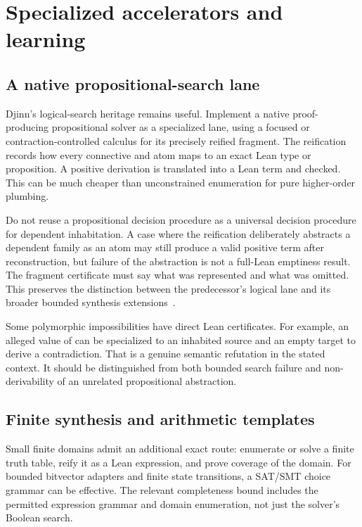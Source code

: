 \section{Specialized accelerators and learning}\label{sec:accelerators}

\subsection{A native propositional-search lane}

Djinn's logical-search heritage remains useful. Implement a native
proof-producing propositional solver as a specialized lane, using a focused or
contraction-controlled calculus for its precisely reified fragment. The
reification records how every connective and atom maps to an exact Lean type
or proposition. A positive derivation is translated into a Lean term and
checked. This can be much cheaper than unconstrained enumeration for pure
higher-order plumbing.

Do not reuse a propositional decision procedure as a universal decision
procedure for dependent inhabitation. A case where the reification deliberately
abstracts a dependent family as an atom may still produce a valid positive
term after reconstruction, but failure of the abstraction is not a full-Lean
emptiness result. The fragment certificate must say what was represented and
what was omitted. This preserves the distinction between the predecessor's
logical lane and its broader bounded synthesis extensions~\cite{djex-readme}.

Some polymorphic impossibilities have direct Lean certificates. For example,
an alleged value of
 can be specialized to an inhabited source and
an empty target to derive a contradiction. That is a genuine semantic
refutation in the stated context. It should be distinguished from both bounded
search failure and non-derivability of an unrelated propositional abstraction.

\subsection{Finite synthesis and arithmetic templates}

Small finite domains admit an additional exact route: enumerate or solve a
finite truth table, reify it as a Lean expression, and prove coverage of the
domain. For bounded bitvector adapters and finite state transitions, a SAT/SMT
choice grammar can be effective. The relevant completeness bound includes the
permitted expression grammar and domain enumeration, not just the solver's
Boolean search.

